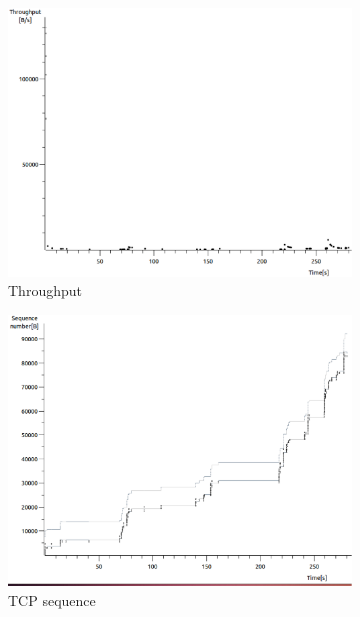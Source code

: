 \documentclass[conference,a4paper]{IEEEtran}
\begin{document}
\begin{figure}
 \centering
 \begin{subfigure}[b]{0.2\textwidth}
  \includegraphics[width=\textwidth]{s2-2_thru}
  \caption{Throughput}
 \end{subfigure}
 \begin{subfigure}[b]{0.2\textwidth}
  \includegraphics[width=\textwidth]{s2-2_seq}
  \caption{TCP sequence}
 \end{subfigure}
 \begin{subfigure}[b]{0.2\textwidth}

\end{subfigure}
\end{figure}
\end{document}
